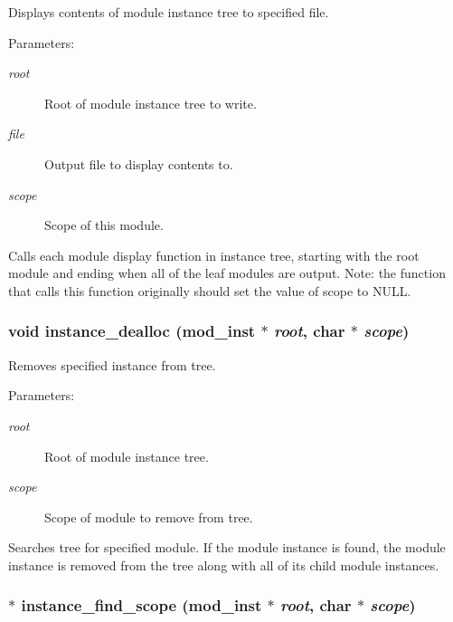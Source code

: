 Displays contents of module instance tree to specified file.

\begin{Desc}
\item[Parameters: ]\par
\begin{description}
\item[{\em 
root}]Root of module instance tree to write. \item[{\em 
file}]Output file to display contents to. \item[{\em 
scope}]Scope of this module.\end{description}
\end{Desc}
Calls each module display function in instance tree, starting with the root module and ending when all of the leaf modules are output. Note: the function that calls this function originally should set the value of scope to NULL. 
\subsubsection{\setlength{\rightskip}{0pt plus 5cm}void instance\_\-dealloc ({\bf mod\_\-inst} $\ast$ {\em root}, char $\ast$ {\em scope})}\label{instance_8c_a3}


Removes specified instance from tree.

\begin{Desc}
\item[Parameters: ]\par
\begin{description}
\item[{\em 
root}]Root of module instance tree. \item[{\em 
scope}]Scope of module to remove from tree.\end{description}
\end{Desc}
Searches tree for specified module. If the module instance is found, the module instance is removed from the tree along with all of its child module instances. 
\subsubsection{$\ast$ instance\_\-find\_\-scope ({\bf mod\_\-inst} $\ast$ {\em root}, char $\ast$ {\em scope})}\label{instance_8c_a0}


